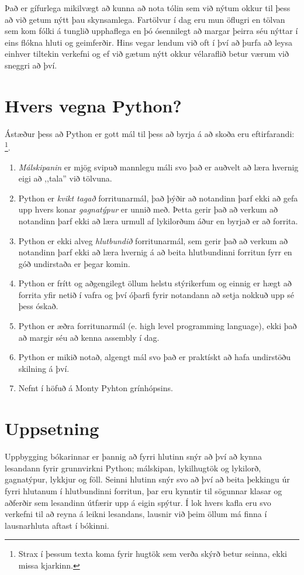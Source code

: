Það er gífurlega mikilvægt að kunna að nota tólin sem við nýtum okkur til þess að við getum nýtt þau skynsamlega.
Fartölvur í dag eru mun öflugri en tölvan sem kom fólki á tunglið upphaflega en þó ósennilegt að margar þeirra séu nýttar í eins flókna hluti og geimferðir.
Hins vegar lendum við oft í því að þurfa að leysa einhver tiltekin verkefni og ef við gætum nýtt okkur vélaraflið betur værum við sneggri að því. 

\section{Hvers vegna Python?}

Ástæður þess að Python er gott mál til þess að byrja á að skoða eru eftirfarandi: \footnote{Strax í þessum texta koma fyrir hugtök sem verða skýrð betur seinna, ekki missa kjarkinn.}.

\begin{enumerate}
	\item \textit{Málskipanin} er mjög svipuð mannlegu máli svo það er auðvelt að læra hvernig eigi að ,,tala'' við tölvuna.
	\item  Python er \textit{kvikt tagað} forritunarmál, það þýðir að notandinn þarf ekki að gefa upp hvers konar \textit{gagnatýpur} er unnið með. 
	Þetta gerir það að verkum að notandinn þarf ekki að læra urmull af lykilorðum áður en byrjað er að forrita.
	\item  Python er ekki alveg \textit{hlutbundið} forritunarmál, sem gerir það að verkum að notandinn þarf ekki að læra hvernig á að beita hlutbundinni forritun fyrr en góð undirstaða er þegar komin.
	\item Python er frítt og aðgengilegt öllum helstu stýrikerfum og einnig er hægt að forrita yfir netið í vafra og því óþarfi fyrir notandann að setja nokkuð upp sé þess óskað.
	\item Python er æðra forritunarmál (e. high level programming language), ekki það að margir séu að kenna assembly í dag.
	\item Python er mikið notað, algengt mál svo það er praktískt að hafa undirstöðu skilning á því.
	\item Nefnt í höfuð á Monty Pyhton grínhópsins.
\end{enumerate}

\section{Uppsetning}
Uppbygging bókarinnar er þannig að fyrri hlutinn snýr að því að kynna lesandann fyrir grunnvirkni Python; málskipan, lykilhugtök og lykilorð, gagnatýpur, lykkjur og föll.
Seinni hlutinn snýr svo að því að beita þekkingu úr fyrri hlutanum í hlutbundinni forritun, þar eru kynntir til sögunnar klasar og aðferðir sem lesandinn útfærir upp á eigin spýtur.
Í lok hvers kafla eru svo verkefni til að reyna á leikni lesandans, lausnir við þeim öllum má finna í lausnarhluta aftast í bókinni.

